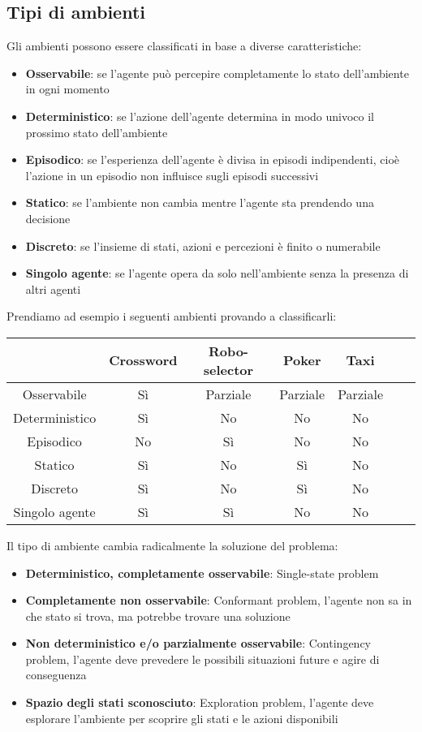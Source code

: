 \documentclass[a4paper]{article}
\begin{document}
\subsection{Tipi di ambienti}
Gli ambienti possono essere classificati in base a diverse caratteristiche:
\begin{itemize}
  \item \textbf{Osservabile}: se l'agente può percepire completamente lo stato dell'ambiente
    in ogni momento
  \item \textbf{Deterministico}: se l'azione dell'agente determina in modo univoco il prossimo stato
    dell'ambiente
  \item \textbf{Episodico}: se l'esperienza dell'agente è divisa in episodi indipendenti,
    cioè l'azione in un episodio non influisce sugli episodi successivi
  \item \textbf{Statico}: se l'ambiente non cambia mentre l'agente sta prendendo una
    decisione
  \item \textbf{Discreto}: se l'insieme di stati, azioni e percezioni è finito o numerabile
  \item \textbf{Singolo agente}: se l'agente opera da solo nell'ambiente senza la presenza
    di altri agenti
\end{itemize}
\begin{example}
  Prendiamo ad esempio i seguenti ambienti provando a classificarli:
  \begin{table}[H]
    \centering
    \begin{tabular}{|c|c|c|c|c|c|c|}
      \hline
      & Crossword & Robo-selector & Poker & Taxi \\
      \hline
      Osservabile & Sì & Parziale & Parziale & Parziale \\
      Deterministico & Sì & No & No & No \\
      Episodico & No & Sì & No & No \\
      Statico & Sì & No & Sì & No \\
      Discreto & Sì & No & Sì & No \\
      Singolo agente & Sì & Sì & No & No \\
      \hline
    \end{tabular}
  \end{table}
\end{example}
Il tipo di ambiente cambia radicalmente la soluzione del problema:
\begin{itemize}
  \item \textbf{Deterministico, completamente osservabile}: Single-state problem
  \item \textbf{Completamente non osservabile}: Conformant problem, l'agente non sa in che
    stato si trova, ma potrebbe trovare una soluzione
  \item \textbf{Non deterministico e/o parzialmente osservabile}: Contingency problem,
    l'agente deve prevedere le possibili situazioni future e agire di conseguenza
  \item \textbf{Spazio degli stati sconosciuto}: Exploration problem, l'agente deve esplorare
    l'ambiente per scoprire gli stati e le azioni disponibili
\end{itemize}
\end{document}
